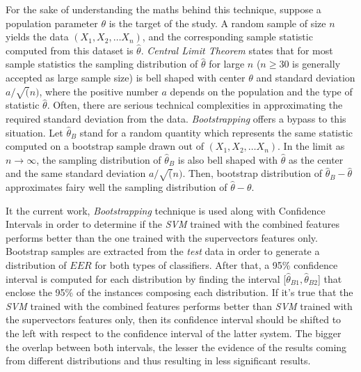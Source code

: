 For the sake of understanding the maths behind this technique,
suppose a population parameter $\theta$ is the target of the study. A random sample
of size $n$ yields the data $(X_{1}, X_{2}, \dotsc X_{n})$, and the corresponding
sample statistic computed from this dataset is ${\hat{\theta}}$.
\textit{Central Limit Theorem} states that for most sample
statistics the sampling distribution of ${\hat{\theta}}$ for large $n$
($n \geq 30$ is generally accepted as large sample size) is bell shaped with
center $\theta$ and standard deviation $a / \sqrt(n)$, where the positive number $a$
depends on the population and the type of statistic ${\hat{\theta}}$.
Often, there are serious technical complexities in approximating the required
standard deviation from the data. \textit{Bootstrapping} offers a bypass to this situation.
Let ${\hat{\theta}}_{B}$ stand for a random quantity which represents the same statistic
computed on a bootstrap sample drawn out of $(X_{1}, X_{2}, \dotsc X_{n})$.
In the limit as $n \to \infty$, the sampling distribution of ${\hat{\theta}}_{B}$
is also bell shaped with ${\hat{\theta}}$ as the center and the same standard deviation
$a / \sqrt(n)$. Then, bootstrap distribution of $\hat{\theta}_{B} - \hat{\theta}$
approximates fairy well the sampling distribution of $\hat{\theta} - \theta$.

It the current work, \textit{Bootstrapping} technique is used along with Confidence
Intervals in order to determine if the \textit{SVM} trained with the combined features
performs better than the one trained with the supervectors features only.
Bootstrap samples are extracted from the \textit{test} data in order
to generate a distribution of $EER$ for both types of classifiers. After that,
a 95\% confidence interval is computed for each distribution by finding the interval
[$\hat{\theta}_{B1}, \hat{\theta}_{B2}$] that enclose the 95\% of the instances
composing each distribution.
If it's true that the \textit{SVM} trained with
the combined features performs better than
\textit{SVM} trained with the supervectors features only, then its confidence
interval should be shifted to the left with respect to the confidence interval
of the latter system.
The bigger the overlap between both intervals, the
lesser the evidence of the results coming from different distributions and thus
resulting in less significant results.
